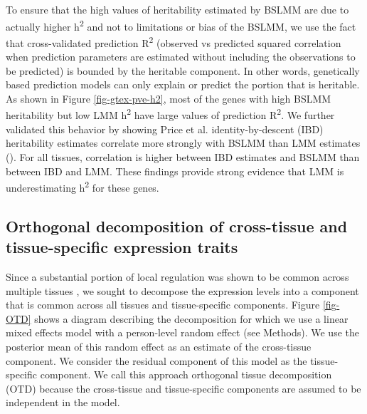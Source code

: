 \documentclass[10pt,letterpaper]{article}
\begin{document}
To ensure that the high values of heritability estimated by BSLMM are due to actually higher h\textsuperscript{2} and not to limitations or bias of the BSLMM, we use the fact that cross-validated prediction R\textsuperscript{2} (observed vs predicted squared correlation when prediction parameters are estimated without including the observations to be predicted) is bounded by the heritable component. In other words, genetically based prediction models can only explain or predict the portion that is heritable. As shown in Figure \ref{fig-gtex-pve-h2}, most of the genes with high BSLMM heritability but low LMM h\textsuperscript{2} have large values of prediction R\textsuperscript{2}. 
We further validated this behavior by showing Price et al. \cite{Price_2011} identity-by-descent (IBD) heritability estimates correlate more strongly with BSLMM than LMM estimates (). For all tissues, correlation is higher between IBD estimates and BSLMM than between IBD and LMM. These findings provide strong evidence that LMM is underestimating h\textsuperscript{2} for these genes.


\subsection*{Orthogonal decomposition 	of cross-tissue and tissue-specific expression traits}

Since a substantial portion of local regulation was shown to be common across multiple tissues \cite{Ardlie_2015}, we sought to decompose the expression levels into a component that is common across all tissues and tissue-specific components. Figure \ref{fig-OTD} shows a diagram describing the decomposition for which we use a linear mixed effects model with a person-level random effect (see Methods). We use the posterior mean of this random effect as an estimate of the cross-tissue component. We consider the residual component of this model as the tissue-specific component. We call this approach orthogonal tissue decomposition (OTD) because the cross-tissue and tissue-specific components are assumed to be independent in the model. 
\end{document}
